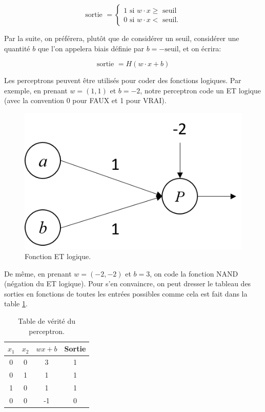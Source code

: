 \[
\text{sortie } =
\begin{cases}
 1 \text{ si } w \cdot x  \geq \text{ seuil} \\
 0 \text{ si } w \cdot x  < \text{ seuil.} 
 \end{cases}
\]

Par la suite, on préférera, plutôt que de considérer un seuil, considérer 
une quantité $b$ que l'on appelera biais définie par $b = -\text{seuil}$, et on écrira:

\[
\text{sortie } = H(w \cdot x + b)
\]

Les perceptrons peuvent être utilisés pour coder des fonctions logiques. 
Par exemple, en prenant $w = (1, 1)$ et $b = -2$, notre perceptron code 
un ET logique (avec la convention 0 pour FAUX et 1 pour VRAI).

\begin{figure}[h]
  \centering
  \includegraphics[scale=0.5]{assets/and-perceptron}
  \caption{Fonction ET logique.}
  \label{fig:and-perceptron}
\end{figure}

De même, en prenant $w = (-2, -2)$ et $b = 3$, on code la fonction NAND 
(négation du ET logique). Pour s'en convaincre, on peut dresser le tableau 
des sorties en fonctions de toutes les entrées possibles comme cela est fait 
dans la table \ref{table:nand-perceptron}.

\begin{table}[h]
  \centering
\begin{tabular}{|c|c|c|c|}
\hline
$x_1$ & $x_2$ & $wx + b$ & Sortie \\
\hline
0     & 0     & 3        & 1 \\  
0     & 1     & 1        & 1 \\  
1     & 0     & 1        & 1 \\  
0     & 0     & -1       & 0 \\   
\hline
\end{tabular} 
  \caption{Table de vérité du perceptron.}
  \label{table:nand-perceptron}
\end{table}

